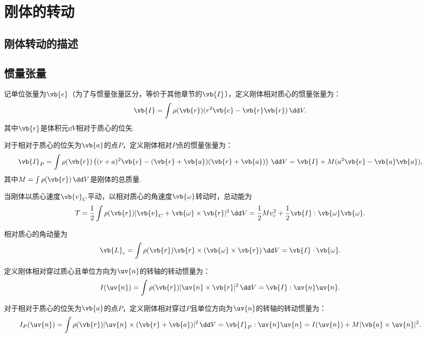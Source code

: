 \chapter{刚体的转动}

\DeclareMathOperator{\sn}{sn}
\DeclareMathOperator{\cn}{cn}
\DeclareMathOperator{\dn}{dn}
\section{刚体转动的描述}
\section{惯量张量}
记单位张量为\(\vb{e}\)（为了与惯量张量区分，等价于其他章节的\(\vb{I}\)），定义刚体相对质心的惯量张量为：
\begin{align*}
	\vb{I} = \int \rho(\vb{r}) (r^2 \vb{e} - \vb{r} \vb{r}) \, \dd V.
\end{align*}
其中\(\vb{r}\)是体积元\(\dd V\)相对于质心的位矢.

对于相对于质心的位矢为\(\vb{a}\)的点\(P\)，定义刚体相对\(P\)点的惯量张量为：
\begin{align*}
	\vb{I}_P = \int \rho(\vb{r}) \left((r + a)^2 \vb{e} - (\vb{r} + \vb{a})(\vb{r} + \vb{a})\right) \, \dd V = \vb{I} + M (a^2 \vb{e} - \vb{a} \vb{a}),
\end{align*}
其中\(M = \int \rho(\vb{r}) \, \dd V\)是刚体的总质量.

当刚体以质心速度\(\vb{v}_C\)平动，以相对质心的角速度\(\vb{\omega}\)转动时，总动能为
\begin{align*}
	T = \frac{1}{2} \int \rho(\vb{r}) |\vb{v}_C + \vb{\omega} \times \vb{r}|^2 \, \dd V = \frac{1}{2} M v_c^2 + \frac{1}{2} \vb{I} : \vb{\omega} \vb{\omega}.
\end{align*}

相对质心的角动量为
\begin{align*}
	\vb{L}_c = \int \rho(\vb{r}) \vb{r} \times (\vb{\omega} \times \vb{r}) \, \dd V = \vb{I} \cdot \vb{\omega}.
\end{align*}

定义刚体相对穿过质心且单位方向为\(\uv{n}\)的转轴的转动惯量为：
\begin{align*}
	I(\uv{n}) = \int \rho(\vb{r}) |\uv{n} \times \vb{r}|^2 \, \dd V = \vb{I} : \uv{n} \uv{n}.
\end{align*}

对于相对于质心的位矢为\(\vb{a}\)的点\(P\)，定义刚体相对穿过\(P\)且单位方向为\(\uv{n}\)的转轴的转动惯量为：
\begin{align*}
	I_P(\uv{n}) = \int \rho(\vb{r}) |\uv{n} \times (\vb{r} + \vb{a})|^2 \, \dd V = \vb{I}_P : \uv{n} \uv{n} = I(\uv{n}) + M |\vb{a} \times \uv{n}|^2.
\end{align*}

